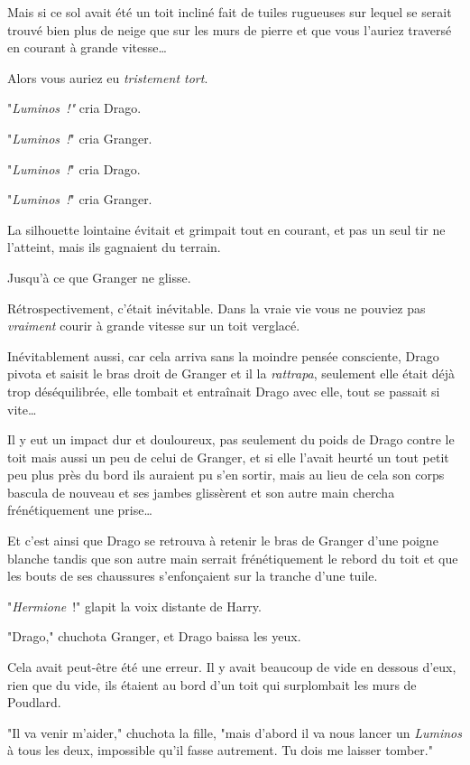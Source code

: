 Mais si ce sol avait été un toit incliné fait de tuiles rugueuses sur lequel se serait trouvé bien plus de neige que sur les murs de pierre et que vous l'auriez traversé en courant à grande vitesse…

Alors vous auriez eu \emph{tristement tort}.

"\emph{Luminos~!"} cria Drago.

"\emph{Luminos~!}" cria Granger.

"\emph{Luminos~!}" cria Drago.

"\emph{Luminos~!}" cria Granger.

La silhouette lointaine évitait et grimpait tout en courant, et pas un seul tir ne l'atteint, mais ils gagnaient du terrain.

Jusqu'à ce que Granger ne glisse.

Rétrospectivement, c'était inévitable. Dans la vraie vie vous ne pouviez pas \emph{vraiment} courir à grande vitesse sur un toit verglacé.

Inévitablement aussi, car cela arriva sans la moindre pensée consciente, Drago pivota et saisit le bras droit de Granger et il la \emph{rattrapa}, seulement elle était déjà trop déséquilibrée, elle tombait et entraînait Drago avec elle, tout se passait si vite…

Il y eut un impact dur et douloureux, pas seulement du poids de Drago contre le toit mais aussi un peu de celui de Granger, et si elle l'avait heurté un tout petit peu plus près du bord ils auraient pu s'en sortir, mais au lieu de cela son corps bascula de nouveau et ses jambes glissèrent et son autre main chercha frénétiquement une prise…

Et c'est ainsi que Drago se retrouva à retenir le bras de Granger d'une poigne blanche tandis que son autre main serrait frénétiquement le rebord du toit et que les bouts de ses chaussures s'enfonçaient sur la tranche d'une tuile.

"\emph{Hermione}~!" glapit la voix distante de Harry.

"Drago," chuchota Granger, et Drago baissa les yeux.

Cela avait peut-être été une erreur. Il y avait beaucoup de vide en dessous d'eux, rien que du vide, ils étaient au bord d'un toit qui surplombait les murs de Poudlard.

"Il va venir m'aider," chuchota la fille, "mais d'abord il va nous lancer un \emph{Luminos} à tous les deux, impossible qu'il fasse autrement. Tu dois me laisser tomber."

